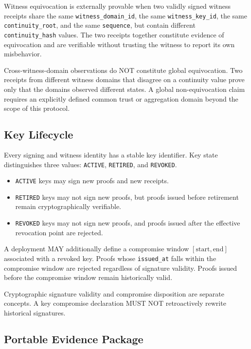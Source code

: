 \documentclass[11pt,a4paper]{article}
\begin{document}
Witness equivocation is externally provable when two validly signed witness receipts share the same \texttt{witness\_domain\_id}, the same \texttt{witness\_key\_id}, the same \texttt{continuity\_root}, and the same \texttt{sequence}, but contain different \texttt{continuity\_hash} values. The two receipts together constitute evidence of equivocation and are verifiable without trusting the witness to report its own misbehavior.

Cross-witness-domain observations do NOT constitute global equivocation. Two receipts from different witness domains that disagree on a continuity value prove only that the domains observed different states. A global non-equivocation claim requires an explicitly defined common trust or aggregation domain beyond the scope of this protocol.

\subsection{Key Lifecycle}

Every signing and witness identity has a stable key identifier. Key state distinguishes three values: \texttt{ACTIVE}, \texttt{RETIRED}, and \texttt{REVOKED}.

\begin{itemize}
\item \texttt{ACTIVE} keys may sign new proofs and new receipts.
\item \texttt{RETIRED} keys may not sign new proofs, but proofs issued before retirement remain cryptographically verifiable.
\item \texttt{REVOKED} keys may not sign new proofs, and proofs issued after the effective revocation point are rejected.
\end{itemize}

A deployment MAY additionally define a compromise window $[\mathrm{start}, \mathrm{end}]$ associated with a revoked key. Proofs whose \texttt{issued\_at} falls within the compromise window are rejected regardless of signature validity. Proofs issued before the compromise window remain historically valid.

Cryptographic signature validity and compromise disposition are separate concepts. A key compromise declaration MUST NOT retroactively rewrite historical signatures.

\subsection{Portable Evidence Package}
\end{document}
